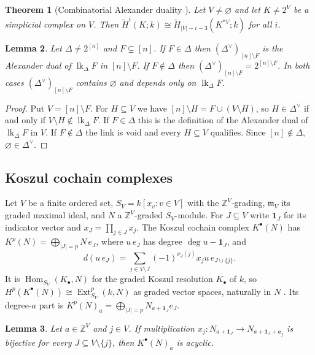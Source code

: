 \documentclass[11pt]{article}
\theoremstyle{plain}
\newtheorem{theorem}{Theorem}[section]
\newtheorem{lemma}[theorem]{Lemma}
\theoremstyle{definition}
\newcommand{\kk}{k}
\newcommand{\ZZ}{\mathbb{Z}}
\newcommand{\mm}{\mathfrak{m}}
\newcommand{\link}{\operatorname{lk}}
\newcommand{\Ext}{\operatorname{Ext}}
\newcommand{\rH}{\widetilde{H}}
\newcommand{\one}{\mathbf 1}
\begin{document}
\begin{theorem}[Combinatorial Alexander duality {\cite{BjornerTancer}}]\label{thm:alexander}
Let $V\neq\varnothing$ and let $K\neq 2^V$ be a simplicial complex on $V$. Then
$\rH^i(K;\kk)\cong\rH_{|V|-i-3}(K^{*V};\kk)$ for all $i$.
\end{theorem}

\begin{lemma}\label{lem:dual-of-link}
Let $\Delta\neq2^{[n]}$ and $F\subsetneq[n]$. If $F\in\Delta$ then $(\Delta^\vee)_{[n]\setminus F}$ is the
Alexander dual of $\link_\Delta F$ in $[n]\setminus F$. If $F\notin\Delta$ then
$(\Delta^\vee)_{[n]\setminus F}=2^{[n]\setminus F}$. In both cases $(\Delta^\vee)_{[n]\setminus F}$ contains
$\varnothing$ and depends only on $\link_\Delta F$.
\end{lemma}

\begin{proof}
Put $V=[n]\setminus F$. For $H\subseteq V$ we have $[n]\setminus H=F\cup(V\setminus H)$, so $H\in\Delta^\vee$
if and only if $V\setminus H\notin\link_\Delta F$. If $F\in\Delta$ this is the definition of the Alexander
dual of $\link_\Delta F$ in $V$. If $F\notin\Delta$ the link is void and every $H\subseteq V$ qualifies.
Since $[n]\notin\Delta$, $\varnothing\in\Delta^\vee$.
\end{proof}

\subsection{Koszul cochain complexes}

Let $V$ be a finite ordered set, $S_V=\kk[x_v:v\in V]$ with the $\ZZ^V$-grading, $\mm_V$ its graded
maximal ideal, and $N$ a $\ZZ^V$-graded $S_V$-module. For $J\subseteq V$ write $\one_J$ for its indicator
vector and $x_J=\prod_{j\in J}x_j$. The Koszul cochain complex $K^\bullet(N)$ has
$K^p(N)=\bigoplus_{|J|=p}N\,e_J$, where $u\,e_J$ has degree $\deg u-\one_J$, and
\[
d(u\,e_J)=\sum_{j\in V\setminus J}(-1)^{\nu_J(j)}x_ju\,e_{J\cup\{j\}}.
\]
It is $\operatorname{Hom}_{S_V}(K_\bullet,N)$ for the graded Koszul resolution $K_\bullet$ of $\kk$, so
$H^p(K^\bullet(N))\cong\Ext^p_{S_V}(\kk,N)$ as graded vector spaces, naturally in $N$ \cite[\S1.6]{BrunsHerzog}.
Its degree-$a$ part is $K^p(N)_a=\bigoplus_{|J|=p}N_{a+\one_J}e_J$.

\begin{lemma}\label{lem:cone}
Let $a\in\ZZ^V$ and $j\in V$. If multiplication $x_j\colon N_{a+\one_J}\to N_{a+\one_J+\mathbf e_j}$ is bijective
for every $J\subseteq V\setminus\{j\}$, then $K^\bullet(N)_a$ is acyclic.
\end{lemma}
\end{document}
